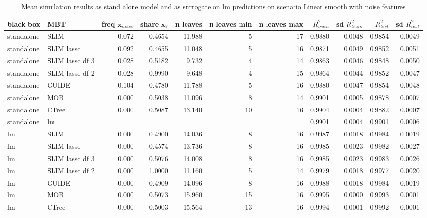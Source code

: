 \begin{table}[!htb]
\centering \tiny
\begin{tabular}[t]{l|l|r|r|r|r|r|r|r|r|r}
\hline
black box & MBT & freq $ \textbf{x}_{noise}$  & share $\textbf{x}_3$ & n leaves & n leaves min & n leaves max & $R^2_{train}$  & sd $R^2_{train}$ & $R^2_{test}$ & sd $R^2_{test}$\\
\hline
standalone & SLIM & 0.072 & 0.4654 & 11.988 & 5 & 17 & 0.9880 & 0.0048 & 0.9854 & 0.0049\\
standalone & SLIM lasso & 0.092 & 0.4655 & 11.048 & 5 & 16 & 0.9871 & 0.0049 & 0.9852 & 0.0051\\
standalone & SLIM lasso df 3 & 0.028 & 0.5182 & 9.732 & 4 & 14 & 0.9863 & 0.0046 & 0.9848 & 0.0050\\
standalone & SLIM lasso df 2 & 0.028 & 0.9990 & 9.648 & 4 & 15 & 0.9864 & 0.0044 & 0.9852 & 0.0047\\
standalone & GUIDE & 0.104 & 0.4780 & 11.788 & 5 & 16 & 0.9880 & 0.0047 & 0.9854 & 0.0048\\
standalone & MOB & 0.000 & 0.5038 & 11.096 & 8 & 14 & 0.9901 & 0.0005 & 0.9878 & 0.0007\\
standalone & CTree & 0.000 & 0.5087 & 13.140 & 10 & 16 & 0.9904 & 0.0004 & 0.9882 & 0.0007\\
\hline

standalone & lm & & & & & & 0.9901 & 0.0004 & 0.9901 & 0.0006\\

\hline
lm & SLIM & 0.000 & 0.4900 & 14.036 & 8 & 16 & 0.9987 & 0.0018 & 0.9984 & 0.0019\\
lm & SLIM lasso & 0.000 & 0.4574 & 13.736 & 8 & 16 & 0.9985 & 0.0023 & 0.9982 & 0.0027\\
lm & SLIM lasso df 3 & 0.000 & 0.5076 & 14.008 & 8 & 16 & 0.9985 & 0.0023 & 0.9983 & 0.0026\\
lm & SLIM lasso df 2 & 0.000 & 1.0000 & 11.160 & 5 & 14 & 0.9979 & 0.0018 & 0.9977 & 0.0020\\
lm & GUIDE & 0.000 & 0.4909 & 14.096 & 8 & 16 & 0.9988 & 0.0018 & 0.9984 & 0.0019\\
lm & MOB & 0.000 & 0.5073 & 15.960 & 15 & 16 & 0.9995 & 0.0000 & 0.9993 & 0.0001\\
lm & CTree & 0.000 & 0.5003 & 15.564 & 13 & 16 & 0.9994 & 0.0001 & 0.9992 & 0.0001\\
\hline
\end{tabular}
\caption{Mean simulation results as stand alone model and as surrogate on lm predictions on scenario Linear smooth with noise features}
\label{tab:linear_smooth_noisy_summary}
\end{table}

